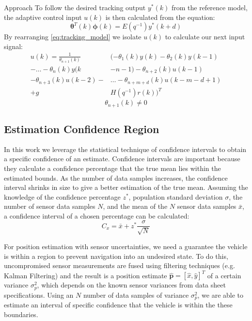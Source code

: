 \begin{section}{Approach}
To follow the desired tracking output $y^*(k)$ from the reference model, the adaptive control input $u(k)$ is then calculated from the equation:
    \begin{equation}
    \label{eq:tracking_model}
	\bm{\theta}^T(k)\bm{\phi}(k)=E(q^{-1})y^*(k+d)
	\end{equation}
By rearranging \eqref{eq:tracking_model} we isolate $u(k)$ to calculate our next input signal:
	\begin{align}
	u(k)=\frac{1}{\theta_{n+1}(k)}&(-\theta_1(k)y(k)-\theta_2(k)y(k-1)  \nonumber \\
    -\dots-\theta_n(k)y(k&-n-1)-\theta_{n+2}(k)u(k-1)  \\
	-\theta_{n+3}(k)u(k-2)-& \dots - \theta_{n+m+d}(k)u(k-m-d+1) \nonumber \\
	+g&H(q^{-1})r(k))^T \nonumber
	\end{align}
    \begin{equation}
	\theta_{n+1}(k)\neq0 \nonumber
	\end{equation}
	
	

\subsection{Estimation Confidence Region}

In this work we leverage the statistical technique of confidence intervals to obtain a specific confidence of an estimate. Confidence intervals are important because they calculate a confidence percentage that the true mean lies within the estimated bounds. As the number of data samples increases, the confidence interval shrinks in size to give a better estimation of the true mean. Assuming the knowledge of the confidence percentage $z^{*}$, population standard deviation $\sigma$, the number of sensor data samples $N$, and the mean of the $N$ sensor data samples $ \bar{x} $, a confidence interval of a chosen percentage can be calculated:
    \begin{equation}
     \label{Confidence_interval}
		C_x = \bar{x} + z^{*}\frac{\sigma}{\sqrt{N}}
	\end{equation}
	
	
For position estimation with sensor uncertainties, we need a guarantee the vehicle is within a region to prevent navigation into an undesired state. To do this, uncompromised sensor measurements are fused using filtering techniques (e.g. Kalman Filtering) and the result is a position estimate $\hat{\bm{p}}=[\hat{x},\hat{y}]^T$ of a certain variance $\sigma_p^2$, which depends on the known sensor variances from data sheet specifications. Using an $N$ number of data samples of variance $\sigma_p^2$, we are able to estimate an interval of specific confidence that the vehicle is within the these boundaries.



\end{section}
